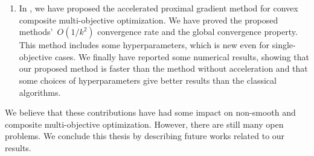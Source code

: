 \documentclass[../main]{subfiles}
\begin{document}
\begin{enumerate}
    \item In , we have proposed the accelerated proximal gradient method for convex composite multi-objective optimization.
        We have proved the proposed methods'~$O(1 / k^2)$ convergence rate and the global convergence property.
        This method includes some hyperparameters, which is new even for single-objective cases.
        We finally have reported some numerical results, showing that our proposed method is faster than the method without acceleration and that some choices of hyperparameters give better results than the classical algorithms.
\end{enumerate}

We believe that these contributions have had some impact on non-smooth and composite multi-objective optimization.
However, there are still many open problems.
We conclude this thesis by describing future works related to our results.
\end{document}
